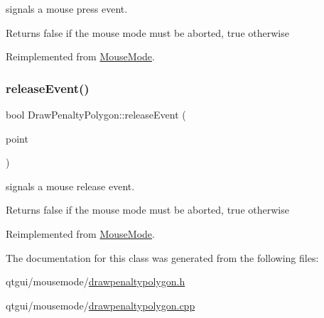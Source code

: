 signals a mouse press event. 

\begin{DoxyReturn}{Returns}
false if the mouse mode must be aborted, true otherwise 
\end{DoxyReturn}


Reimplemented from \mbox{\hyperlink{class_mouse_mode_ac726911a60e2cbd733d6d6a55d2ceba9}{Mouse\+Mode}}.

\mbox{\label{class_draw_penalty_polygon_a6e6baf20d2b77cca3d4b15b2c8a64c16}} 
\subsubsection{\texorpdfstring{releaseEvent()}{releaseEvent()}}
{\footnotesize\ttfamily bool Draw\+Penalty\+Polygon\+::release\+Event (\begin{DoxyParamCaption}\item[{const Q\+PointF \&}]{point }\end{DoxyParamCaption})\hspace{0.3cm}{\ttfamily [virtual]}}



signals a mouse release event. 

\begin{DoxyReturn}{Returns}
false if the mouse mode must be aborted, true otherwise 
\end{DoxyReturn}


Reimplemented from \mbox{\hyperlink{class_mouse_mode_a9515661d7c29ab234b7e70d0fe7e5db0}{Mouse\+Mode}}.



The documentation for this class was generated from the following files\+:\begin{DoxyCompactItemize}
\item 
qtgui/mousemode/\mbox{\hyperlink{drawpenaltypolygon_8h}{drawpenaltypolygon.\+h}}\item 
qtgui/mousemode/\mbox{\hyperlink{drawpenaltypolygon_8cpp}{drawpenaltypolygon.\+cpp}}\end{DoxyCompactItemize}
